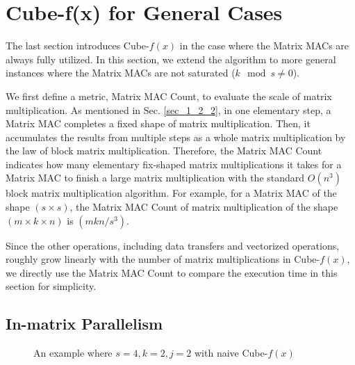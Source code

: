 \documentclass[12pt]{extbook}
\begin{document}
\section{Cube-f(x) for General Cases \label{sec:4}}

The last section introduces Cube-$f(x)$ in the case where the Matrix MACs are always fully utilized. In this section, we extend the algorithm to more general instances where the Matrix MACs are not saturated ($k \mod s \neq 0$).

We first define a metric, Matrix MAC Count, to evaluate the scale of matrix multiplication. As mentioned in Sec. \ref{sec_1_2_2}, in one elementary step, a Matrix MAC completes a fixed shape of matrix multiplication. Then, it accumulates the results from multiple steps as a whole matrix multiplication by the law of block matrix multiplication. Therefore, the Matrix MAC Count indicates how many elementary fix-shaped matrix multiplications it takes for a Matrix MAC to finish a large matrix multiplication with the standard $O(n^3)$ block matrix multiplication algorithm. For example, for a Matrix MAC of the shape $(s \times s)$, the Matrix MAC Count of matrix multiplication of the shape $(m \times k \times n)$ is $(mkn / s^3)$.

Since the other operations, including data transfers and vectorized operations, roughly grow linearly with the number of matrix multiplications in Cube-$f(x)$, we directly use the Matrix MAC Count to compare the execution time in this section for simplicity.

\subsection{In-matrix Parallelism}

\begin{figure}[t]
    \caption{An example where $s = 4, k = 2, j = 2$ with naive Cube-$f(x)$}
    \label{fig:problem}
    \end{figure}
\end{document}
